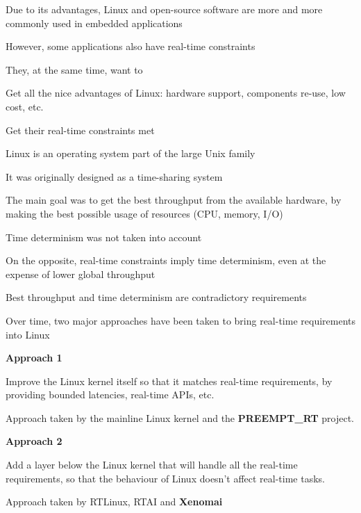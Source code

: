 

  \startitemize
  \item Due to its advantages, Linux and open-source software are more
    and more commonly used in embedded applications
  \item However, some applications also have real-time constraints
  \item They, at the same time, want to
    \startitemize
    \item Get all the nice advantages of Linux: hardware support,
      components re-use, low cost, etc.
    \item Get their real-time constraints met
    \stopitemize
  \stopitemize

  \startitemize
  \item Linux is an operating system part of the large Unix family
  \item It was originally designed as a time-sharing system
    \startitemize
    \item The main goal was to get the best throughput from the
      available hardware, by making the best possible usage of
      resources (CPU, memory, I/O)
    \item Time determinism was not taken into account
    \stopitemize
  \item On the opposite, real-time constraints imply time determinism,
    even at the expense of lower global throughput
  \item Best throughput and time determinism are contradictory
    requirements
  \stopitemize

  \startitemize
  \item Over time, two major approaches have been taken to bring
    real-time requirements into Linux
  \item {\bf Approach 1}
    \startitemize
    \item Improve the Linux kernel itself so that it matches real-time
      requirements, by providing bounded latencies, real-time APIs,
      etc.
    \item Approach taken by the mainline Linux kernel and the
      {\bf PREEMPT\_RT} project.
    \stopitemize
  \item {\bf Approach 2}
    \startitemize
    \item Add a layer below the Linux kernel that will handle all the
      real-time requirements, so that the behaviour of Linux doesn't
      affect real-time tasks.
    \item Approach taken by RTLinux, RTAI and {\bf Xenomai}
    \stopitemize
  \stopitemize

